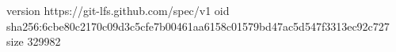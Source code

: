 version https://git-lfs.github.com/spec/v1
oid sha256:6cbe80c2170c09d3c5cfe7b00461aa6158c01579bd47ac5d547f3313ec92c727
size 329982

